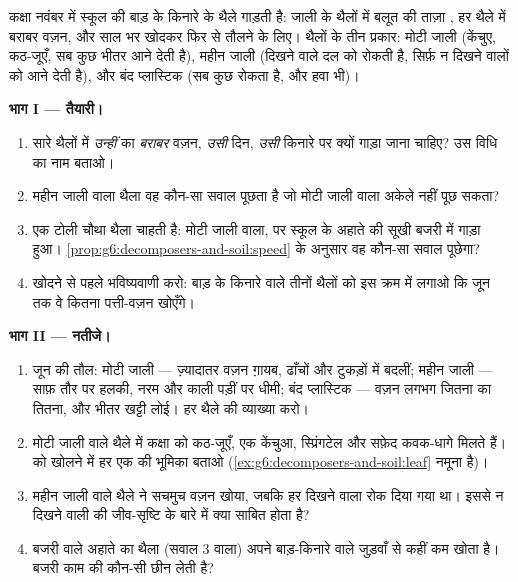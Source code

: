 \begin{problem}[{सप्ताहांत समस्या --- जाली के थैले, गाड़ी हुई पत्तियाँ,
और मृदा-विज्ञान की एक सर्दी}]\label{pb:g6:decomposers-and-soil:1}
कक्षा नवंबर में स्कूल की बाड़ के किनारे  के थैले गाड़ती है: जाली
के थैलों में बलूत की ताज़ा , हर थैले में बराबर वज़न, और साल भर
खोदकर फिर से तौलने के लिए। थैलों के तीन प्रकार: मोटी जाली (केंचुए,
कठ-जूएँ, सब कुछ भीतर आने देती है), महीन जाली (दिखने वाले दल को रोकती
है, सिर्फ़ न दिखने वालों को आने देती है), और बंद प्लास्टिक (सब कुछ
रोकता है, और हवा भी)।

\medskip\noindent\textbf{भाग I --- तैयारी।}
\begin{enumerate}
  \item सारे थैलों में \emph{उन्हीं}  का \emph{बराबर} वज़न,
        \emph{उसी} दिन, \emph{उसी} किनारे पर क्यों गाड़ा जाना चाहिए?
        उस विधि का नाम बताओ।
  \item महीन जाली वाला थैला वह कौन-सा सवाल पूछता है जो मोटी जाली वाला
        अकेले नहीं पूछ सकता?
  \item एक टोली चौथा थैला चाहती है: मोटी जाली वाला, पर स्कूल के अहाते
        की सूखी बजरी में गाड़ा हुआ।
        \cref{prop:g6:decomposers-and-soil:speed} के अनुसार वह कौन-सा
        सवाल पूछेगा?
  \item खोदने से पहले भविष्यवाणी करो: बाड़ के किनारे वाले तीनों थैलों
        को इस क्रम में लगाओ कि जून तक वे कितना पत्ती-वज़न खोएँगे।
\end{enumerate}

\medskip\noindent\textbf{भाग II --- नतीजे।}
\begin{enumerate}[resume]
  \item जून की तौल: मोटी जाली --- ज़्यादातर वज़न ग़ायब, 
        ढाँचों और टुकड़ों में बदलीं; महीन जाली --- साफ़ तौर पर हलकी,
         नरम और काली पड़ीं पर धीमी; बंद प्लास्टिक --- वज़न
        लगभग जितना का तितना, और भीतर खट्टी लोई। हर थैले की व्याख्या
        करो।
  \item मोटी जाली वाले थैले में कक्षा को कठ-जूएँ, एक केंचुआ,
        स्प्रिंगटेल और सफ़ेद कवक-धागे मिलते हैं।  को खोलने में हर
        एक की भूमिका बताओ
        (\cref{ex:g6:decomposers-and-soil:leaf} नमूना है)।
  \item महीन जाली वाले थैले ने सचमुच वज़न खोया, जबकि हर दिखने वाला 
        रोक दिया गया था। इससे न दिखने वाली  की जीव-सृष्टि के
        बारे में क्या साबित होता है?
  \item बजरी वाले अहाते का थैला (सवाल 3 वाला) अपने बाड़-किनारे वाले
        जुड़वाँ से कहीं कम खोता है। बजरी काम की कौन-सी 
        छीन लेती है?
\end{enumerate}


\end{problem}
